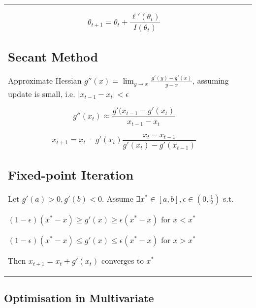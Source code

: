 \begin{tabulary}{\textwidth}{l L}
$$
\theta_{t+1} = \theta_t + \frac{\ell'(\theta_t)}{I(\theta_t)}
$$

\subsection{Secant Method}

Approximate Hessian $g''(x) = \lim_{y\rightarrow x} \frac{g'(y) - g'(x)}{y - x}$, assuming update is small, i.e. $|x_{t-1} - x_t| < \epsilon$

$$
g''(x_t) \approx \frac{g'(x_{t-1} - g'(x_t)}{x_{t-1} - x_t}
$$

$$
x_{t+1} = x_t - g'(x_t) \frac{x_t - x_{t-1}}{g'(x_t) - g'(x_{t-1})}
$$

\subsection{Fixed-point Iteration}

Let $g'(a) > 0, g'(b) < 0$. Assume $\exists x^* \in [a, b], \epsilon \in (0, \frac{1}{2})$ s.t.

$(1-\epsilon) (x^* -x) \geq g'(x) \geq \epsilon(x^*-x)$ for $x < x^*$

$(1-\epsilon) (x^* -x) \leq g'(x) \leq \epsilon(x^*-x)$ for $x > x^*$

Then $x_{t+1} = x_t + g'(x_t)$ converges to $x^*$

\end{tabulary}

\subsection{Optimisation in Multivariate}

